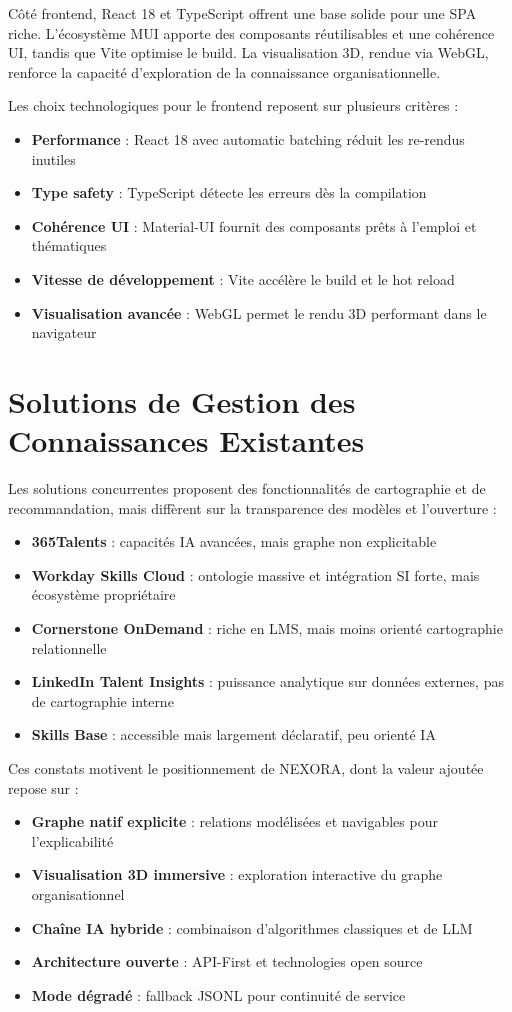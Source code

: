 \documentclass[12pt,a4paper]{report}
\begin{document}
Côté frontend, React 18 et TypeScript offrent une base solide pour une SPA riche. L'écosystème MUI apporte des composants réutilisables et une cohérence UI, tandis que Vite optimise le build. La visualisation 3D, rendue via WebGL, renforce la capacité d'exploration de la connaissance organisationnelle.

Les choix technologiques pour le frontend reposent sur plusieurs critères :
\begin{itemize}
  \item \textbf{Performance} : React 18 avec automatic batching réduit les re-rendus inutiles
  \item \textbf{Type safety} : TypeScript détecte les erreurs dès la compilation
  \item \textbf{Cohérence UI} : Material-UI fournit des composants prêts à l'emploi et thématiques
  \item \textbf{Vitesse de développement} : Vite accélère le build et le hot reload
  \item \textbf{Visualisation avancée} : WebGL permet le rendu 3D performant dans le navigateur
\end{itemize}

\section{Solutions de Gestion des Connaissances Existantes}
Les solutions concurrentes proposent des fonctionnalités de cartographie et de recommandation, mais diffèrent sur la transparence des modèles et l'ouverture :
\begin{itemize}
  \item \textbf{365Talents} : capacités IA avancées, mais graphe non explicitable
  \item \textbf{Workday Skills Cloud} : ontologie massive et intégration SI forte, mais écosystème propriétaire
  \item \textbf{Cornerstone OnDemand} : riche en LMS, mais moins orienté cartographie relationnelle
  \item \textbf{LinkedIn Talent Insights} : puissance analytique sur données externes, pas de cartographie interne
  \item \textbf{Skills Base} : accessible mais largement déclaratif, peu orienté IA
\end{itemize}

Ces constats motivent le positionnement de NEXORA, dont la valeur ajoutée repose sur :
\begin{itemize}
  \item \textbf{Graphe natif explicite} : relations modélisées et navigables pour l'explicabilité
  \item \textbf{Visualisation 3D immersive} : exploration interactive du graphe organisationnel
  \item \textbf{Chaîne IA hybride} : combinaison d'algorithmes classiques et de LLM
  \item \textbf{Architecture ouverte} : API-First et technologies open source
  \item \textbf{Mode dégradé} : fallback JSONL pour continuité de service
\end{itemize}
\end{document}
